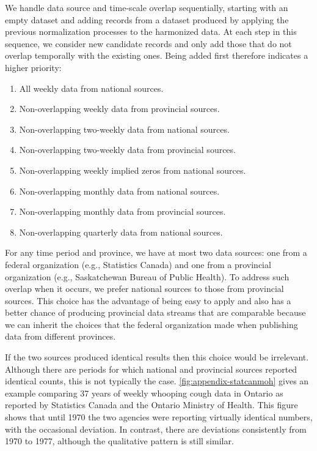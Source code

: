 \documentclass[12pt]{article}
\begin{document}
We handle data source and time-scale overlap sequentially, starting with an empty dataset and adding records from a dataset produced by applying the previous normalization processes to the harmonized data. At each step in this sequence, we consider new candidate records and only add those that do not overlap temporally with the existing ones. Being added first therefore indicates a higher priority:
\begin{enumerate}
  \item All weekly data from national sources.
  \item Non-overlapping weekly data from provincial sources.
  \item Non-overlapping two-weekly data from national sources.
  \item Non-overlapping two-weekly data from provincial sources.
  \item Non-overlapping weekly implied zeros from national sources.
  \item Non-overlapping monthly data from national sources.
  \item Non-overlapping monthly data from provincial sources.
  \item Non-overlapping quarterly data from national sources.
\end{enumerate}

For any time period and province, we have at most two data sources: one from a federal organization (e.g., Statistics Canada) and one from a provincial organization (e.g., Saskatchewan Bureau of Public Health). To address such overlap when it occurs, we prefer national sources to those from provincial sources. This choice has the advantage of being easy to apply and also has a better chance of producing provincial data streams that are comparable because we can inherit the choices that the federal organization made when publishing data from different provinces.

If the two sources produced identical results then this choice would be irrelevant. Although there are periods for which national and provincial sources reported identical counts, this is not typically the case. \cref{fig:appendix-statcanmoh} gives an example comparing 37 years of weekly whooping cough data in Ontario as reported by Statistics Canada and the Ontario Ministry of Health. This figure shows that until 1970 the two agencies were reporting virtually identical numbers, with the occasional deviation. In contrast, there are deviations consistently from 1970 to 1977, although the qualitative pattern is still similar.
\end{document}
